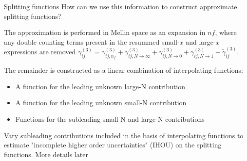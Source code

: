 \documentclass[aspectratio=169, 9pt,t]{beamer}
\begin{document}
\begin{frame}{Splitting functions}
  How can we use this information to construct approximate splitting functions?

  The approximation is performed in Mellin space as an expansion in $nf$, where any double counting terms present in the resummed small-$x$ and large-$x$ expressions are removed
  $\gamma_{i j}^{(3)}=\gamma_{i j, n_f}^{(3)}+\gamma_{i j, N \rightarrow \infty}^{(3)}+\gamma_{i j, N \rightarrow 0}^{(3)}+\gamma_{i j, N \rightarrow 1}^{(3)}+\widetilde{\gamma}_{i j}^{(3)}$.

  The remainder is constructed as a linear combination of interpolating functions:
  \begin{itemize}
    \item A function for the leading unknown large-N contribution
    \item A function for the leading unknown small-N contribution
    \item Functions for the subleading small-N and large-N contributions
  \end{itemize}

  Vary subleading contributions included in the basis of interpolating functions to estimate "incomplete higher order uncertainties" (IHOU) on the splitting functions. More details later
\end{frame}
\end{document}
